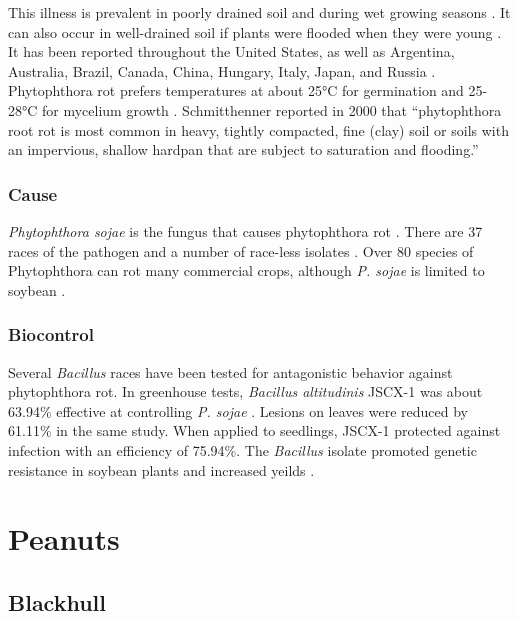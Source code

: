 \documentclass[letterpaper, 12pt]{report}
\begin{document}
This illness is prevalent in poorly drained soil and during wet growing seasons \autocite{dunleavy1966soybean}. It can also occur in well-drained soil if plants were flooded when they were young \autocite{schmitthenner2000phytophthora}. It has been reported throughout the United States, as well as Argentina, Australia, Brazil, Canada, China, Hungary, Italy, Japan, and Russia \autocite{schmitthenner2000phytophthora}. Phytophthora rot prefers temperatures at about 25°C for germination and 25-28°C for mycelium growth \autocite{schmitthenner2000phytophthora}. Schmitthenner reported in 2000 that ``phytophthora root rot is most common in heavy, tightly compacted, fine (clay) soil or soils with an impervious, shallow hardpan that are subject to saturation and flooding.''

\subsection{Cause}

\emph{Phytophthora sojae} is the fungus that causes phytophthora rot \autocite{dunleavy1966soybean}. There are 37 races of the pathogen and a number of race-less isolates \autocite{schmitthenner2000phytophthora}. Over 80 species of Phytophthora can rot many commercial crops, although \emph{P. sojae} is limited to soybean \autocite{tyler2007phytophthora}.

\subsection{Biocontrol}

Several \emph{Bacillus} races have been tested for antagonistic behavior against phytophthora rot. In greenhouse tests, \emph{Bacillus altitudinis} JSCX-1 was about 63.94\% effective at controlling \emph{P. sojae} \autocite{lu2017isolation}. Lesions on leaves were reduced by 61.11\% in the same study. When applied to seedlings, JSCX-1 protected against infection with an efficiency of 75.94\%. The \emph{Bacillus} isolate promoted genetic resistance in soybean plants and increased yeilds \autocite{lu2017isolation}.



\chapter{Peanuts}


\section{Blackhull}
\end{document}
